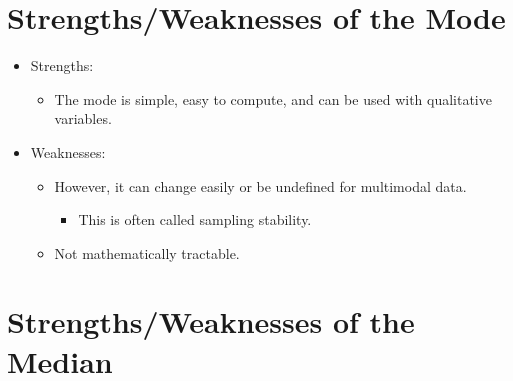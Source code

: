 \documentclass[12pt]{article}
\begin{document}
\section{Strengths/Weaknesses of the
Mode}\label{strengthsweaknesses-of-the-mode}

\begin{itemize}
\itemsep1pt\parskip0pt
\item
  Strengths:

  \begin{itemize}
  \itemsep1pt\parskip0pt
  \item
    The mode is simple, easy to compute, and can be used with
    qualitative variables.
  \end{itemize}
\item
  Weaknesses:

  \begin{itemize}
  \itemsep1pt\parskip0pt
  \item
    However, it can change easily or be undefined for multimodal data.

    \begin{itemize}
    \itemsep1pt\parskip0pt
    \item
      This is often called sampling stability.
    \end{itemize}
  \item
    Not mathematically tractable.
  \end{itemize}
\end{itemize}

\section{Strengths/Weaknesses of the
Median}\label{strengthsweaknesses-of-the-median}
\end{document}
